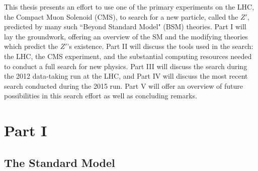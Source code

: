 This thesis presents an effort to use one of the primary experiments on the LHC, the Compact Muon Solenoid (CMS), to search for a new particle, called the \emph{$Z\prime$}, predicted by many such ``Beyond Standard Model" (BSM) theories. Part I will lay the groundwork, offering an overview of the SM and the modifying theories which predict the $Z\prime$'s existence. Part II will discuss the tools used in the search: the LHC, the CMS experiment, and the substantial computing resources needed to conduct a full search for new physics. Part III will discuss the search during the 2012 data-taking run at the LHC, and Part IV will discuss the most recent search conducted during the 2015 run. Part V will offer an overview of future possibilities in this search effort as well as concluding remarks.

\part{\huge Part I}

\chapter{The Standard Model}

